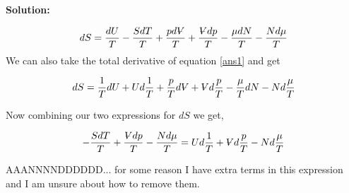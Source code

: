 \documentclass[10pt]{article}
\newenvironment{Solution}
    {\textbf{Solution:}
    
    \vspace{5mm}
    \begin{tcolorbox}
    }
    {
    \end{tcolorbox}
    \vspace{5mm}
    }
\newcommand{\vol}{{\ooalign{\hfil$V$\hfil\cr\kern0.08em--\hfil\cr}}}
\begin{document}
\begin{enumerate}[(a)]
\begin{Solution}
\begin{equation}\label{dS}
    dS = \frac{dU}{T} - \frac{S dT}{T} + \frac{p d\vol}{T} + \frac{\vol dp}{T} - \frac{\mu dN}{T} - \frac{N d\mu}{T}
\end{equation}
We can also take the total derivative of equation \ref{ans1} and get

\begin{equation}
dS=\frac{1}{T} dU + U d\frac{1}{T} + \frac{p}{T} d\vol + \vol d\frac{p}{T} -\frac{\mu}{T} dN - N d\frac{\mu}{T}
\end{equation}

Now combining our two expressions for $dS$ we get,

\begin{equation}\label{dSdS}
     - \frac{S dT}{T}  + \frac{\vol dp}{T} - \frac{N d\mu}{T} 
    =  U d\frac{1}{T}  + \vol d\frac{p}{T}  - N d\frac{\mu}{T}
\end{equation}

AAANNNNDDDDDD... for some reason I have extra terms in this expression and I am unsure about how to remove them.
\end{Solution}
\end{enumerate}
\end{document}

